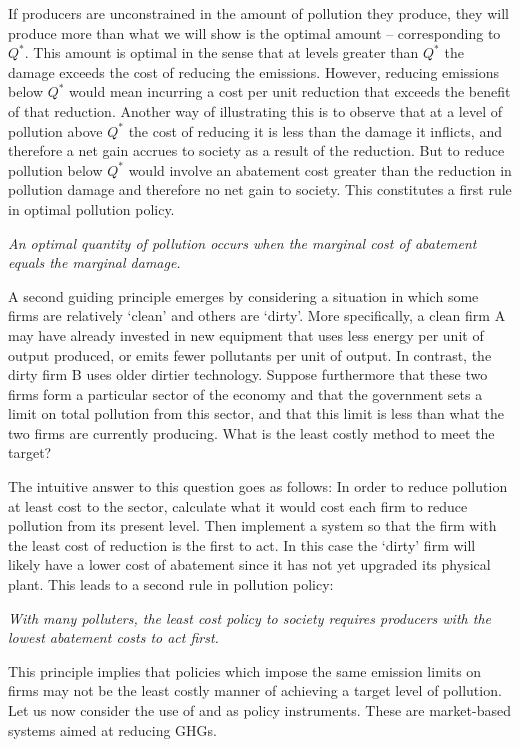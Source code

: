 If producers are unconstrained in the amount of pollution they produce, they
will produce more than what we will show is the optimal amount --
corresponding to $Q^*$. This amount is optimal in the sense that at
levels greater than $Q^*$ the damage exceeds the cost of reducing the
emissions. However, reducing emissions below $Q^*$ would
mean incurring a cost per unit reduction that exceeds the benefit of that
reduction. Another way of illustrating this is to observe that at a level of
pollution above $Q^*$ the cost of reducing it is less than the damage
it inflicts, and therefore a net gain accrues to society as a result of the
reduction. But to reduce pollution below $Q^*$ would involve an
abatement cost greater than the reduction in pollution damage and therefore
no net gain to society. This constitutes a first rule in optimal pollution
policy.

\textit{An optimal quantity of pollution occurs when the marginal cost of
abatement equals the marginal damage.}

A second guiding principle emerges by considering a situation in which some
firms are relatively `clean' and others are `dirty'. More specifically, a
clean firm A may have already invested in new equipment that uses less
energy per unit of output produced, or emits fewer pollutants per unit of
output. In contrast, the dirty firm B uses older dirtier technology. Suppose
furthermore that these two firms form a particular sector of the economy and
that the government sets a limit on total pollution from this sector, and
that this limit is less than what the two firms are currently producing.
What is the least costly method to meet the target?

\newhtmlpage

The intuitive answer to this question goes as follows: In order to reduce
pollution at least cost to the sector, calculate what it would cost each
firm to reduce pollution from its present level. Then implement a system so
that the firm with the least cost of reduction is the first to act. In this
case the `dirty' firm will likely have a lower cost of abatement since it
has not yet upgraded its physical plant. This leads to a second rule in
pollution policy:

\textit{With many polluters, the least cost policy to society requires
producers with the lowest abatement costs to act first.}

This principle implies that policies which impose the same emission limits
on firms may not be the least costly manner of achieving a target level of
pollution. Let us now consider the use of  and %
 as policy instruments. These are
market-based systems aimed at reducing GHGs.

